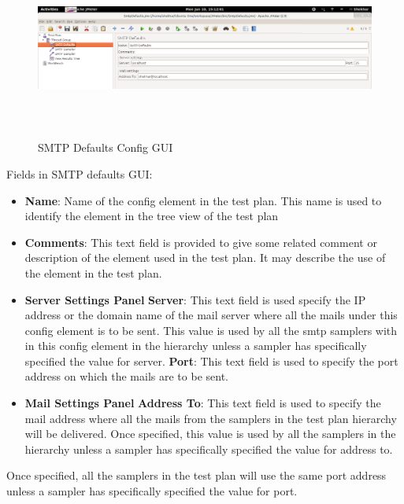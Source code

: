 \documentclass[12pt]{book}
\begin{document}
  \begin{figure}[H]
   \centering
   \includegraphics[width=14.5cm, height=6cm]{images/smtpdefaults_1}
   \caption{SMTP Defaults Config GUI\label{fig:fig18_JMeter}}
  \end{figure}

  Fields in SMTP defaults GUI:
  \begin{itemize}
   \item \textbf{Name}: Name of the config element in the test plan. This name is used to identify the element in the tree view of the test plan
   \item \textbf{Comments}: This text field is provided to give some related comment or description of the element used in the test plan.
   It may describe the use of the element in the test plan.
   \item \textbf{Server Settings Panel}
    \subitem \textbf{Server}: This text field is used specify the IP address or the domain name of the mail server where all the mails under this 
    config element is to be sent. This value is used by all the smtp samplers with in this config element in the hierarchy unless a sampler has 
    specifically specified the value for server.
    \subitem \textbf{Port}: This text field is used to specify the port address on which the mails are to be sent. 
   \item \textbf{Mail Settings Panel}
    \subitem \textbf{Address To}: This text field is used to specify the mail address where all the mails from the samplers in the test plan
    hierarchy will be delivered. Once specified, this value is used by all the samplers in the hierarchy unless a sampler has specifically specified
    the value for address to.
  \end{itemize}
  
  Once specified, all the samplers in the test plan will use the same port address unless a sampler has specifically specified the value for port.
  
\end{document}

